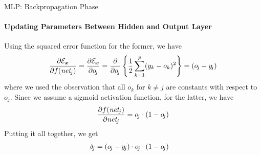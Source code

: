 \begin{frame}{MLP: Backpropagation Phase}
\framesubtitle{Updating Parameters Between Hidden and Output Layer}
Using the squared error function %
for the former, we have
\begin{align*}
   \frac{\partial {\mathcal E}_{\boldsymbol x}}{\partial f(\mathit{net}_{\!j})}  =
   \frac{\partial {\mathcal E}_{\boldsymbol x}}{\partial o_{\!j}}
   = \frac{\partial}{\partial o_{\!j}} \left\{\frac{1}{2} \sum^{p}_{k=1}
   (y_{k} - o_{k})^2\right\} \notag
   = \left( o_{\!j} - y_{\!j} \right)
\end{align*}
where we used the observation that all $o_k$ for $k \ne j$ are constants
with respect to $o_{\!j}$.
Since we assume a sigmoid activation function, for the latter, we have
\begin{align*}
   \frac{\partial f(\mathit{net}_{\!j})}{\partial \mathit{net}_{\!j}}  
   = o_{\!j} \cdot \left(1 - o_{\!j}\right)
\end{align*}
Putting it all together, we get
\begin{align*}
    \delta_{\!j} & =\left( o_{\!j} - y_{\!j} \right) \cdot o_{\!j} \cdot \left(1 -
   o_{\!j}\right)
\end{align*}
\end{frame}
%
